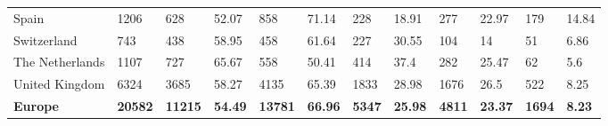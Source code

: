 \begin{tabular}{llllllllllll}
  Spain & 1206 & 628 & 52.07 & 858 & 71.14 & 228 & 18.91 & 277 & 22.97 & 179 & 14.84 \\ 
  Switzerland & 743 & 438 & 58.95 & 458 & 61.64 & 227 & 30.55 & 104 & 14 & 51 & 6.86 \\ 
  The Netherlands & 1107 & 727 & 65.67 & 558 & 50.41 & 414 & 37.4 & 282 & 25.47 & 62 & 5.6 \\ 
  United Kingdom & 6324 & 3685 & 58.27 & 4135 & 65.39 & 1833 & 28.98 & 1676 & 26.5 & 522 & 8.25 \\ 
  \textbf{\textbf{Europe}} & \textbf{20582} & \textbf{11215} & \textbf{54.49} & \textbf{13781} & \textbf{66.96} & \textbf{5347} & \textbf{25.98} & \textbf{4811} & \textbf{23.37} & \textbf{1694} & \textbf{8.23} \\ 
   \bottomrule
\end{tabular}
